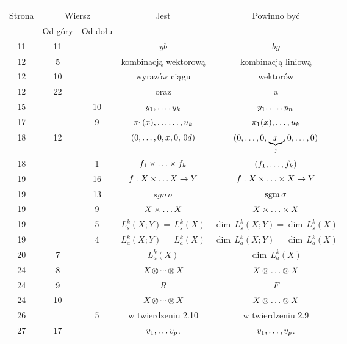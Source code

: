 \documentclass[a4paper,11pt]{article}
\begin{document}
\newpage
{}
\begin{center}
  \begin{tabular}{|c|c|c|c|c|}
    \hline
    & \multicolumn{2}{c|}{} & & \\
    Strona & \multicolumn{2}{c|}{Wiersz} & Jest
                              & Powinno być \\ \cline{2-3}
    & Od góry & Od dołu & & \\
    \hline
    11  & 11 & & $y b$ & $b y$ \\
    12  &  5 & & kombinacją wektorową &  kombinacją liniową \\
    12  & 10 & & wyrazów ciągu & wektorów \\
    12  & 22 & & oraz & a \\
    15  & & 10 & $y_{ 1 }, \ldots , y_{ k }$ & $y_{ 1 }, \ldots , y_{ n }$ \\
    17  & &  9 & $\pi_{ 1 }( x ), \ldots\ldots, u_{ k }$
           & $\pi_{ 1 }( x ), \ldots, u_{ k }$ \\
    18  & 12 & & $( 0, \ldots, 0, x, 0, \, 0d )$
           & $( 0, \ldots, 0, \underbrace{ x }_{ j }, 0, \ldots, 0 )$ \\
    18  & &  1 & $f_{ 1 } \times \ldots \times f_{ k }$
           & $( f_{ 1 }, \ldots, f_{ k } )$ \\
    19  & & 16 & $f : X \times \ldots X \to Y$ & $f : X \times \ldots \times X \to Y$ \\
    19  & & 13 & $sgn\, \sigma$ & $\mathrm{sgm}\, \sigma$ \\
    19  & &  9 & $X \times \ldots X$ & $X \times \ldots \times X$ \\
    19  & &  5 & $L^{ k }_{ s } ( X; Y ) = \, L^{ k }_{ s } ( X )$
           & $\dim \, L^{ k }_{ s } ( X; Y ) = \dim \, L^{ k }_{ s } ( X )$ \\
    19  & &  4 & $L^{ k }_{ a } ( X; Y ) = \, L^{ k }_{ a } ( X )$
           & $\dim \, L^{ k }_{ a } ( X; Y ) = \dim \, L^{ k }_{ a } ( X )$ \\
    20  &  7 & & $L_{ a }^{ k }( X )$ & $\dim \, L_{ a }^{ k }( X )$ \\
    24  &  8 & & $X \otimes \cdots \otimes X$ & $X \otimes \ldots \otimes X$ \\
    24  &  9 & & $R$ & $F$ \\
    24  & 10 & & $X \otimes \cdots \otimes X$ & $X \otimes \ldots \otimes X$ \\
    26  & &  5 & w twierdzeniu 2.10 & w twierdzeniu 2.9 \\
    27  & 17 & & $v_{ 1 }, \ldots v_{ p }$. & $v_{ 1 }, \ldots, v_{ p }$. \\

\end{tabular}
\end{center}
\end{document}
